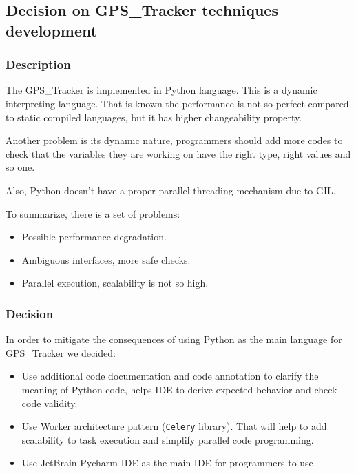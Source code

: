 \subsection{Decision on GPS\_Tracker techniques
development}\label{decision-on-gps_tracker-techniques-development}

\subsubsection{Description}\label{description}

The GPS\_Tracker is implemented in Python language. This is a dynamic
interpreting language. That is known the performance is not so perfect
compared to static compiled languages, but it has higher changeability
property.

Another problem is its dynamic nature, programmers should add more codes
to check that the variables they are working on have the right type,
right values and so one.

Also, Python doesn't have a proper parallel threading mechanism due to
GIL.

To summarize, there is a set of problems:

\begin{itemize}
\tightlist
\item
  Possible performance degradation.
\item
  Ambiguous interfaces, more safe checks.
\item
  Parallel execution, scalability is not so high.
\end{itemize}

\subsubsection{Decision}\label{decision}

In order to mitigate the consequences of using Python as the main
language for GPS\_Tracker we decided:

\begin{itemize}
\tightlist
\item
  Use additional code documentation and code annotation to clarify the
  meaning of Python code, helps IDE to derive expected behavior and
  check code validity.
\item
  Use Worker architecture pattern (\texttt{Celery} library). That will
  help to add scalability to task execution and simplify parallel code
  programming.
\item
  Use JetBrain Pycharm IDE as the main IDE for programmers to use
\end{itemize}

